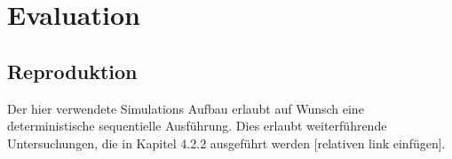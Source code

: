 \chapter{Evaluation}

\section{Reproduktion}

Der hier verwendete Simulations Aufbau erlaubt auf Wunsch eine deterministische sequentielle Ausführung. Dies erlaubt weiterführende Untersuchungen, die in Kapitel 4.2.2 ausgeführt werden [relativen link einfügen].



